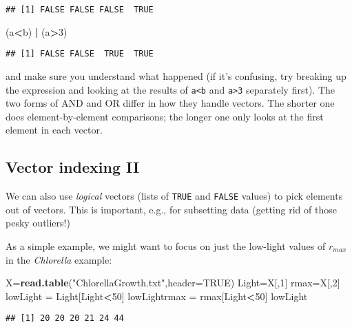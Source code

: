 \documentclass[11pt,]{article}
\newenvironment{Shaded}{\begin{snugshade}}{\end{snugshade}}
\newcommand{\KeywordTok}[1]{\textcolor[rgb]{0.13,0.29,0.53}{\textbf{#1}}}
\newcommand{\DataTypeTok}[1]{\textcolor[rgb]{0.13,0.29,0.53}{#1}}
\newcommand{\DecValTok}[1]{\textcolor[rgb]{0.00,0.00,0.81}{#1}}
\newcommand{\StringTok}[1]{\textcolor[rgb]{0.31,0.60,0.02}{#1}}
\newcommand{\OtherTok}[1]{\textcolor[rgb]{0.56,0.35,0.01}{#1}}
\newcommand{\OperatorTok}[1]{\textcolor[rgb]{0.81,0.36,0.00}{\textbf{#1}}}
\newcommand{\NormalTok}[1]{#1}
\begin{document}
\begin{verbatim}
## [1] FALSE FALSE FALSE  TRUE
\end{verbatim}

\begin{Shaded}
\begin{Highlighting}[]
\NormalTok{(a}\OperatorTok{<}\NormalTok{b) }\OperatorTok{|}\StringTok{ }\NormalTok{(a}\OperatorTok{>}\DecValTok{3}\NormalTok{)}
\end{Highlighting}
\end{Shaded}

\begin{verbatim}
## [1] FALSE FALSE  TRUE  TRUE
\end{verbatim}

and make sure you understand what happened (if it's confusing, try
breaking up the expression and looking at the results of
\texttt{a\textless{}b} and \texttt{a\textgreater{}3} separately first).
The two forms of AND and OR differ in how they handle vectors. The
shorter one does element-by-element comparisons; the longer one only
looks at the first element in each vector.

\subsection{Vector indexing II}\label{vector-indexing-ii}

We can also use \emph{logical} vectors (lists of \texttt{TRUE} and
\texttt{FALSE} values) to pick elements out of vectors. This is
important, e.g., for subsetting data (getting rid of those pesky
outliers!)

As a simple example, we might want to focus on just the low-light values
of \(r_{max}\) in the \emph{Chlorella} example:

\begin{Shaded}
\begin{Highlighting}[]
\NormalTok{X=}\KeywordTok{read.table}\NormalTok{(}\StringTok{"ChlorellaGrowth.txt"}\NormalTok{,}\DataTypeTok{header=}\OtherTok{TRUE}\NormalTok{)}
\NormalTok{Light=X[,}\DecValTok{1}\NormalTok{]}
\NormalTok{rmax=X[,}\DecValTok{2}\NormalTok{]}
\NormalTok{lowLight =}\StringTok{ }\NormalTok{Light[Light}\OperatorTok{<}\DecValTok{50}\NormalTok{]}
\NormalTok{lowLightrmax =}\StringTok{ }\NormalTok{rmax[Light}\OperatorTok{<}\DecValTok{50}\NormalTok{]}
\NormalTok{lowLight}
\end{Highlighting}
\end{Shaded}

\begin{verbatim}
## [1] 20 20 20 21 24 44
\end{verbatim}
\end{document}
